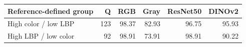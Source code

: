 \begin{tabular}{lrrrrr}
\toprule
Reference-defined group & Q & RGB & Gray & ResNet50 & DINOv2 \\
\midrule
High color / low LBP & 123 & 98.37 & 82.93 & 96.75 & 95.93 \\
High LBP / low color & 92 & 98.91 & 73.91 & 98.91 & 90.22 \\
\bottomrule
\end{tabular}
